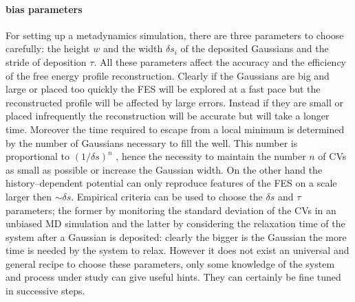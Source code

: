\paragraph{\textbf{bias parameters}} For setting up a metadynamics simulation, there are three parameters to 
choose carefully: the height $w$ and the width $\delta s_i$ of the deposited Gaussians and the stride of 
deposition $\tau$. All these parameters affect the accuracy and the efficiency of the free energy profile 
reconstruction. Clearly if the Gaussians are big and large or placed too quickly the \ac{FES} will be explored at 
a fast pace but the reconstructed profile will be affected by large errors. Instead if they are small or placed 
infrequently the reconstruction will be accurate but will take a longer time. Moreover the time required to escape 
from a local minimum is determined by the number of Gaussians necessary to fill the well. This number is 
proportional to $(1/\delta s)^n$ \cite{MetadReview}, hence the necessity to maintain the number $n$ of \acp{CV} as 
small as possible or increase the Gaussian width. On the other hand the history--dependent potential can only 
reproduce features of the \ac{FES} on a scale larger then $\sim \delta s$. Empirical criteria can be used to 
choose the $\delta s$ and $\tau$ parameters; the former by monitoring the standard deviation of the \acp{CV} in an 
unbiased \ac{MD} simulation and the latter by considering the relaxation time of the system after a Gaussian is 
deposited: clearly the bigger is the Gaussian the more time is needed by the system to relax. However it does not 
exist an universal and general recipe to choose these parameters, only some knowledge of the system and process 
under study can give useful hints. They can certainly be fine tuned in successive steps.

